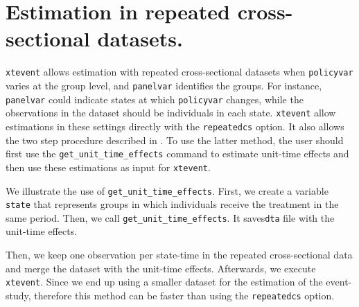 \documentclass[bib]{./sty/statapress}
\begin{document}
\begin{stlog}
\nullskip
\end{stlog}

\section{Estimation in repeated cross-sectional datasets.}

\texttt{xtevent} allows estimation with repeated cross-sectional datasets when \texttt{policyvar} varies at the group level, and \texttt{panelvar} identifies the groups.
For instance, \texttt{panelvar} could indicate states at which \texttt{policyvar} changes, while the observations in the dataset should be individuals in each state. 
\texttt{xtevent} allow estimations in these settings directly with the \texttt{repeatedcs} option.
It also allows the two step procedure described in \citet{hansen2007generalized}.
To use the latter method, the user should first use the \texttt{get\_unit\_time\_effects} command to estimate unit-time effects and then use these estimations as input for \texttt{xtevent}.

We illustrate the use of \texttt{get\_unit\_time\_effects}.
First, we create a variable \texttt{state} that represents groups in which individuals receive the treatment in the same period.
Then, we call \texttt{get\_unit\_time\_effects}.
It saves\texttt{dta} file with the unit-time effects.

\begin{stlog}
\nullskip
\end{stlog}

Then, we keep one observation per state-time in the repeated cross-sectional data and merge the dataset with the unit-time effects.
Afterwards, we execute \texttt{xtevent}.
Since we end up using a smaller dataset for the estimation of the event-study, therefore this method can be faster than using the \texttt{repeatedcs} option.

\begin{stlog}
\nullskip
\end{stlog}
\end{document}
